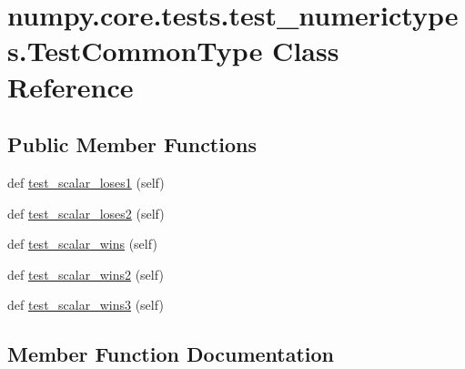 \hypertarget{classnumpy_1_1core_1_1tests_1_1test__numerictypes_1_1TestCommonType}{}\section{numpy.\+core.\+tests.\+test\+\_\+numerictypes.\+Test\+Common\+Type Class Reference}
\label{classnumpy_1_1core_1_1tests_1_1test__numerictypes_1_1TestCommonType}
\subsection*{Public Member Functions}
\begin{DoxyCompactItemize}
\item 
def \hyperlink{classnumpy_1_1core_1_1tests_1_1test__numerictypes_1_1TestCommonType_a4fe4ae1b419e63e139a8e21442fd7987}{test\+\_\+scalar\+\_\+loses1} (self)
\item 
def \hyperlink{classnumpy_1_1core_1_1tests_1_1test__numerictypes_1_1TestCommonType_a341e3f3030efbe2b1b525302df35f9a6}{test\+\_\+scalar\+\_\+loses2} (self)
\item 
def \hyperlink{classnumpy_1_1core_1_1tests_1_1test__numerictypes_1_1TestCommonType_afcddcc8b144537bb4c9853d5b3fccc0c}{test\+\_\+scalar\+\_\+wins} (self)
\item 
def \hyperlink{classnumpy_1_1core_1_1tests_1_1test__numerictypes_1_1TestCommonType_a7717f85b84bfb1e61b5f584c0b85a43e}{test\+\_\+scalar\+\_\+wins2} (self)
\item 
def \hyperlink{classnumpy_1_1core_1_1tests_1_1test__numerictypes_1_1TestCommonType_ab4627b3470b4439c9d1668bdb1ffea14}{test\+\_\+scalar\+\_\+wins3} (self)
\end{DoxyCompactItemize}


\subsection{Member Function Documentation}
\mbox{\label{classnumpy_1_1core_1_1tests_1_1test__numerictypes_1_1TestCommonType_a4fe4ae1b419e63e139a8e21442fd7987}} 
